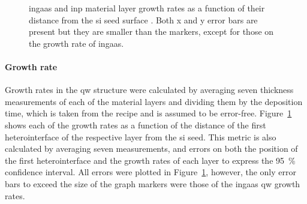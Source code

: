\begin{figure}
    \centering
    \caption{\acs{ingaas} and \acs{inp} material layer growth rates as a function of their distance from the \acs{si} seed surface \cite{Brugnolotto2023_2}. Both x and y error bars are present but they are smaller than the markers, except for those on the growth rate of \acs{ingaas}.}
    \label{fig:s6_growth_rates}
\end{figure}

\paragraph{Growth rate} Growth rates in the \acl{qw} structure were calculated by averaging seven thickness measurements of each of the material layers and dividing them by the deposition time, which is taken from the recipe and is assumed to be error-free. Figure~\ref{fig:s6_growth_rates} shows each of the growth rates as a function of the distance of the first heterointerface of the respective layer from the \acs{si} seed. This metric is also calculated by averaging seven measurements, and errors on both the position of the first heterointerface and the growth rates of each layer to express the \qty{95}{\%} confidence interval. All errors were plotted in Figure~\ref{fig:s6_growth_rates}, however, the only error bars to exceed the size of the graph markers were those of the \acs{ingaas} \acl{qw} growth rates.

